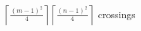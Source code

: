 \documentclass[preview]{standalone}
\begin{document}
\begin{center}
$\left\lceil\frac{(m-1)^2}{4}\right\rceil \left\lceil\frac{(n-1)^2}{4}\right\rceil$ crossings
\end{center}
\end{document}
